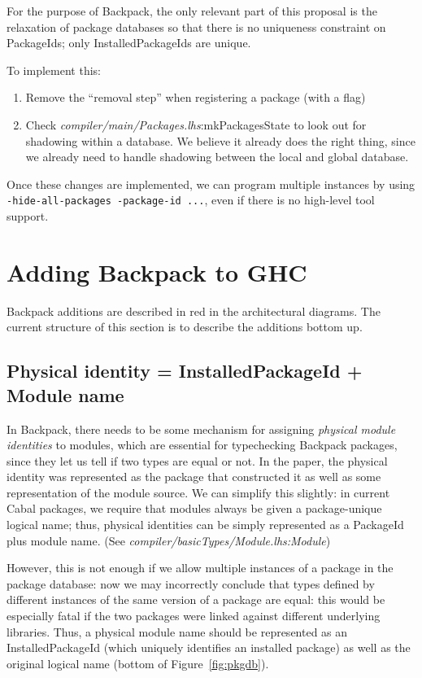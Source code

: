 \documentclass{article}
\newcommand{\ghcfile}[1]{\textsl{#1}}
\begin{document}
For the purpose of Backpack, the only relevant part of this proposal
is the relaxation of package databases so that there is no uniqueness
constraint on PackageIds; only InstalledPackageIds are unique.

To implement this:

\begin{enumerate}

    \item Remove the ``removal step'' when registering a package (with a flag)

    \item Check \ghcfile{compiler/main/Packages.lhs}:mkPackagesState to look out for shadowing
      within a database. We believe it already does the right thing, since
      we already need to handle shadowing between the local and global database.

\end{enumerate}

Once these changes are implemented, we can program multiple instances by
using \verb|-hide-all-packages -package-id ...|, even if there is no
high-level tool support.

\section{Adding Backpack to GHC}

Backpack additions are described in red in the architectural diagrams.
The current structure of this section is to describe the additions bottom up.

\subsection{Physical identity = InstalledPackageId + Module name}\label{sec:ipi}

In Backpack, there needs to be some mechanism for assigning
\emph{physical module identities} to modules, which are essential for
typechecking Backpack packages, since they let us tell if two types are
equal or not. In the paper, the physical identity was represented as the
package that constructed it as well as some representation of the module
source.  We can simplify this slightly: in current Cabal packages, we
require that modules always be given a package-unique logical name;
thus, physical identities can be simply represented as a PackageId plus
module name. (See \ghcfile{compiler/basicTypes/Module.lhs:Module})

However, this is not enough if we allow multiple instances of a package
in the package database: now we may incorrectly conclude that types
defined by different instances of the same version of a package are
equal: this would be especially fatal if the two packages were linked
against different underlying libraries.  Thus, a physical module name
should be represented as an InstalledPackageId (which uniquely
identifies an installed package) as well as the original logical name
(bottom of Figure~\ref{fig:pkgdb}).
\end{document}
